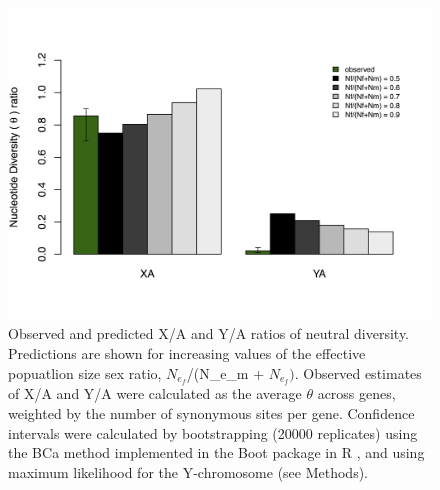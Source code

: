 \documentclass[9pt,twocolumn,twoside]{gsajnl}
\begin{document}
\begin{figure}[htbp]
\centering
\noindent
\includegraphics[width=\linewidth]{figure2.jpg}
\caption{Observed and predicted X/A and Y/A ratios of neutral diversity. Predictions are shown for increasing values of the effective popuatlion size sex ratio, $N_{e}_{f}$/(N_{e}_{m} + $N_{e}_{f})$. Observed estimates of X/A and Y/A were calculated as the average $\theta$ across genes, weighted by the number of synonymous sites per gene. Confidence intervals were calculated by bootstrapping (20000 replicates) using the BCa method \citep{efron1987better} implemented in the Boot package in R \citep{canty2012boot}, and using maximum likelihood for the Y-chromosome (see Methods).
}
\label{fig:ratios}
\end{figure}
\end{document}
